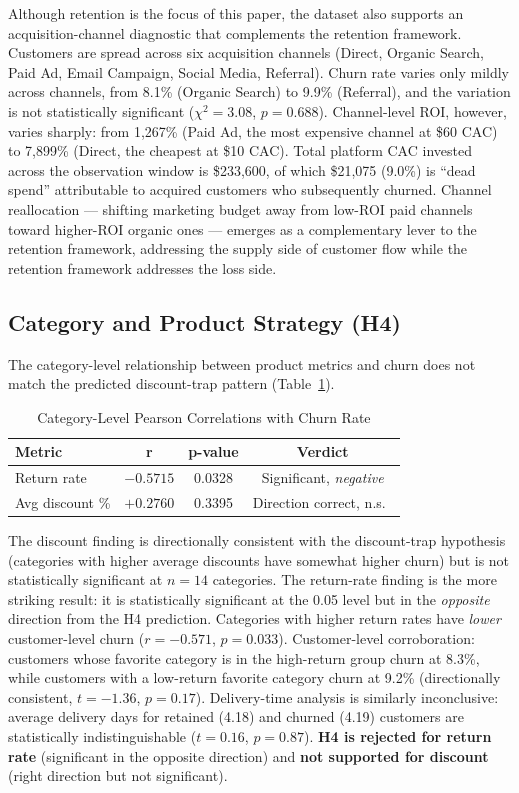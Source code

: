 \documentclass[conference]{IEEEtran}
\begin{document}
Although retention is the focus of this paper, the dataset also supports an acquisition-channel diagnostic that complements the retention framework. Customers are spread across six acquisition channels (Direct, Organic Search, Paid Ad, Email Campaign, Social Media, Referral). Churn rate varies only mildly across channels, from 8.1\% (Organic Search) to 9.9\% (Referral), and the variation is not statistically significant ($\chi^2 = 3.08$, $p = 0.688$). Channel-level ROI, however, varies sharply: from 1{,}267\% (Paid Ad, the most expensive channel at \$60 CAC) to 7{,}899\% (Direct, the cheapest at \$10 CAC). Total platform CAC invested across the observation window is \$233{,}600, of which \$21{,}075 (9.0\%) is ``dead spend'' attributable to acquired customers who subsequently churned. Channel reallocation — shifting marketing budget away from low-ROI paid channels toward higher-ROI organic ones — emerges as a complementary lever to the retention framework, addressing the supply side of customer flow while the retention framework addresses the loss side.

\subsection{Category and Product Strategy (H4)}

The category-level relationship between product metrics and churn does not match the predicted discount-trap pattern (Table~\ref{tab:h4}).

\begin{table}[h]
\caption{Category-Level Pearson Correlations with Churn Rate}
\label{tab:h4}
\centering
\renewcommand{\arraystretch}{1.2}
\begin{tabular}{l c c c}
\toprule
\textbf{Metric} & \textbf{r} & \textbf{p-value} & \textbf{Verdict} \\
\midrule
Return rate     & $-0.5715$ & 0.0328 & Significant, \emph{negative} \\
Avg discount \% & $+0.2760$ & 0.3395 & Direction correct, n.s.\ \\
\bottomrule
\end{tabular}
\end{table}

The discount finding is directionally consistent with the discount-trap hypothesis (categories with higher average discounts have somewhat higher churn) but is not statistically significant at $n = 14$ categories. The return-rate finding is the more striking result: it is statistically significant at the 0.05 level but in the \emph{opposite} direction from the H4 prediction. Categories with higher return rates have \emph{lower} customer-level churn ($r = -0.571$, $p = 0.033$). Customer-level corroboration: customers whose favorite category is in the high-return group churn at 8.3\%, while customers with a low-return favorite category churn at 9.2\% (directionally consistent, $t = -1.36$, $p = 0.17$). Delivery-time analysis is similarly inconclusive: average delivery days for retained (4.18) and churned (4.19) customers are statistically indistinguishable ($t = 0.16$, $p = 0.87$). \textbf{H4 is rejected for return rate} (significant in the opposite direction) and \textbf{not supported for discount} (right direction but not significant).
\end{document}
